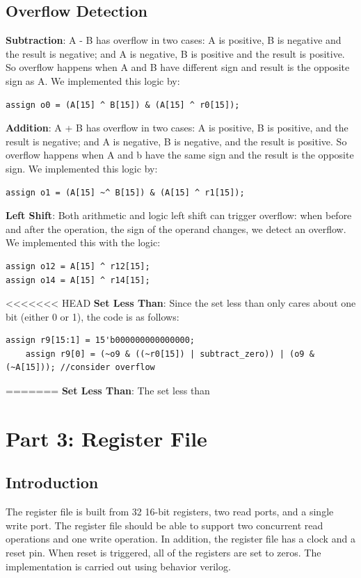 \documentclass{article}
\begin{document}
\subsection{Overflow Detection}
\textbf{Subtraction}: A - B has overflow in two cases: A is positive, B is negative and the result is negative; and A is negative, B is positive and the result is positive. So overflow happens when A and B have different sign and result is the opposite sign as A. We implemented this logic by: 
\begin{verbatim}
assign o0 = (A[15] ^ B[15]) & (A[15] ^ r0[15]);
\end{verbatim}
\vspace{5mm}
\textbf{Addition}: A + B has overflow in two cases: A is positive, B is positive, and the result is negative; and A is negative, B is negative, and the result is positive. So overflow happens when A and b have the same sign and the result is the opposite sign. We implemented this logic by:
\begin{verbatim}
assign o1 = (A[15] ~^ B[15]) & (A[15] ^ r1[15]);
\end{verbatim}
\vspace{5mm}
\textbf{Left Shift}: 
Both arithmetic and logic left shift can trigger overflow: when before and after the operation, the sign of the operand changes, we detect an overflow. We implemented this with the logic: 
\begin{verbatim}
assign o12 = A[15] ^ r12[15];
assign o14 = A[15] ^ r14[15];
\end{verbatim}
\vspace{5mm}
<<<<<<< HEAD
\textbf{Set Less Than}: 
Since the set less than only cares about one bit (either 0 or 1), the code is as follows: 
\begin{verbatim}
assign r9[15:1] = 15'b000000000000000;
	assign r9[0] = (~o9 & ((~r0[15]) | subtract_zero)) | (o9 & (~A[15])); //consider overflow
\end{verbatim}
=======
\textbf{Set Less Than}: The set less than 



\section{Part 3: Register File }
\subsection{Introduction}
The register file is built from 32 16-bit registers, two read ports, and a single write port. The register file should be able to support two concurrent read operations and one write operation. In addition, the register file has a clock and a reset pin. When reset is triggered, all of the registers are set to zeros. The implementation is carried out using behavior verilog. 
\end{document}
